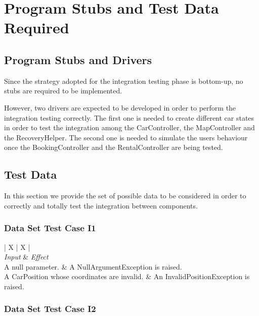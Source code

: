 \chapter{Program Stubs and Test Data Required}

\section{Program Stubs and Drivers}
Since the strategy adopted for the integration testing phase is bottom-up, no stubs are required to be implemented.

However, two drivers are expected to be developed in order to perform the integration testing correctly. The first one is needed to create different car states in order to test the integration among the CarController, the MapController and the RecoveryHelper. The second one is needed to simulate the users behaviour once the BookingController and the RentalController are being tested.

\section{Test Data}
In this section we provide the set of possible data to be considered in order to correctly and totally test the integration between components.

\subsection{Data Set Test Case I1}

\begin{table}[H]
	\begin{tabularx}{\textwidth}{| X | X |}
		\hline
			\\	\hline
		\textit{Input}	&	\textit{Effect}	\\	\hline
			A null parameter.	&	A NullArgumentException is raised.\\	\hline
			A CarPosition whose coordinates are invalid.	&	An InvalidPositionException is raised.\\	\hline
	\end{tabularx}
	\captionsetup{textformat=empty,labelformat=blank}
	\caption{Data Set Test Case I1}
	\label{table:data-set-table-1}
\end{table}

\subsection{Data Set Test Case I2}

